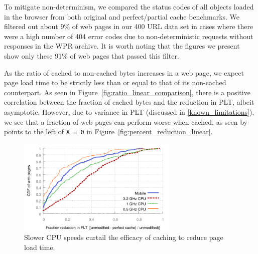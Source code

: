 To mitigate non-determinism, we compared the status codes of all objects loaded in the browser from both original and perfect/partial cache benchmarks. We filtered out about 9\% of web pages in our 400 URL data set in cases where there were a high number of 404 error codes due to non-deterministic requests without responses in the WPR archive. It is worth noting that the figures we present show only these 91\% of web pages that passed this filter.

As the ratio of cached to non-cached bytes increases in a web page, we expect page load time to be strictly less than or equal to that of its non-cached counterpart. As seen in Figure~\ref{fig:ratio_linear_comparison}, there is a positive correlation between the fraction of cached bytes and the reduction in PLT, albeit asymptotic.
However, due to variance in PLT (discussed in \ref{known_limitations}), we see that a fraction of web pages can perform worse when cached, as seen by points to the left of \texttt{X = 0} in Figure~\ref{fig:percent_reduction_linear}.



\begin{figure}[t]
    \includegraphics[width=3in]{../graphs/percent_plt_reduction/percent_reduction_linear_CPU_comparison.pdf}
    \caption[]{\label{fig:plt_cpu_comparison}Slower CPU speeds curtail the efficacy of caching to reduce page load time.}
\end{figure}
